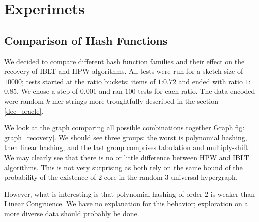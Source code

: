 \chapter{Experimets}

\section{Comparison of Hash Functions}
We decided to compare different hash function families and their effect on the recovery of IBLT and HPW algorithms. All tests were run for a sketch size of $10000$; tests started at the ratio buckets: items of $1$:$0.72$ and ended with ratio $1$:$0.85$. We chose a step of $0.001$ and ran $100$ tests for each ratio. The data encoded were random $k$-mer strings more troughtfully described in the section \ref{dec_oracle}.

We look at the graph comparing all possible combinations together Graph\ref{fig: graph_recovery}. We should see three groups: the worst is polynomial hashing, then linear hashing, and the last group comprises tabulation and multiply-shift.  We may clearly see that there is no or little difference between HPW and IBLT algorithms. This is not very surprising as both rely on the same bound of the probability of the existence of $2$-core in the random $3$-universal hypergraph. 

However, what is interesting is that polynomial hashing of order $2$ is weaker than Linear Congruence. We have no explanation for this behavior; exploration on a more diverse data should probably be done. 


